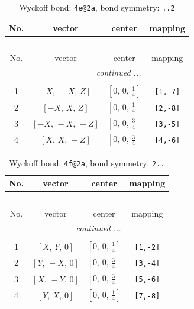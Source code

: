 \documentclass[fleqn,8pt]{jsarticle}
\begin{document}
\renewcommand{\arraystretch}{1.2}
\begin{longtable}{cccc}
\caption{Wyckoff bond: {\tt 4e@2a}, bond symmetry: {\tt ..2}}
 \\
 \hline \hline
No. & vector & center & mapping \\ \hline \endfirsthead

\multicolumn{3}{l}{\tablename\ \thetable{}} \\
 \hline \hline
No. & vector & center & mapping \\ \hline \endhead

 \hline \hline
\multicolumn{3}{r}{\footnotesize\it continued ...} \\ \endfoot

 \hline \hline
\multicolumn{3}{r}{} \\ \endlastfoot

1 & $\left[ X,\, - X,\, Z \right]$ & $\left[ 0,\, 0,\, \frac{1}{4} \right]$ & {\tt [1,-7]} \\ \hline
2 & $\left[ - X,\, X,\, Z \right]$ & $\left[ 0,\, 0,\, \frac{1}{4} \right]$ & {\tt [2,-8]} \\ \hline
3 & $\left[ - X,\, - X,\, - Z \right]$ & $\left[ 0,\, 0,\, \frac{3}{4} \right]$ & {\tt [3,-5]} \\ \hline
4 & $\left[ X,\, X,\, - Z \right]$ & $\left[ 0,\, 0,\, \frac{3}{4} \right]$ & {\tt [4,-6]} \\
\end{longtable}
\renewcommand{\arraystretch}{1.2}
\begin{longtable}{cccc}
\caption{Wyckoff bond: {\tt 4f@2a}, bond symmetry: {\tt 2..}}
 \\
 \hline \hline
No. & vector & center & mapping \\ \hline \endfirsthead

\multicolumn{3}{l}{\tablename\ \thetable{}} \\
 \hline \hline
No. & vector & center & mapping \\ \hline \endhead

 \hline \hline
\multicolumn{3}{r}{\footnotesize\it continued ...} \\ \endfoot

 \hline \hline
\multicolumn{3}{r}{} \\ \endlastfoot

1 & $\left[ X,\, Y,\, 0 \right]$ & $\left[ 0,\, 0,\, \frac{1}{4} \right]$ & {\tt [1,-2]} \\ \hline
2 & $\left[ Y,\, - X,\, 0 \right]$ & $\left[ 0,\, 0,\, \frac{3}{4} \right]$ & {\tt [3,-4]} \\ \hline
3 & $\left[ X,\, - Y,\, 0 \right]$ & $\left[ 0,\, 0,\, \frac{3}{4} \right]$ & {\tt [5,-6]} \\ \hline
4 & $\left[ Y,\, X,\, 0 \right]$ & $\left[ 0,\, 0,\, \frac{1}{4} \right]$ & {\tt [7,-8]} \\
\end{longtable}
\end{document}
